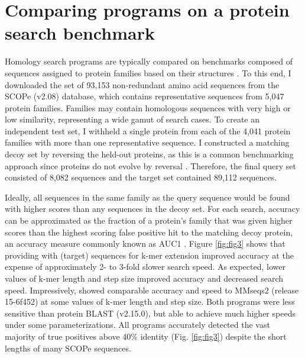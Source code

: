 \section{Comparing programs on a protein search benchmark}\label{comparing-programs-on-a-protein-search-benchmark}

Homology search programs are typically compared on benchmarks composed of sequences assigned to protein families based on their structures \citep{RN4253}. To this end, I downloaded the set of 93,153 non-redundant amino acid sequences from the SCOPe (v2.08) database, which contains representative sequences from 5,047 protein families. Families may contain homologous sequences with very high or low similarity, representing a wide gamut of search cases. To create an independent test set, I withheld a single protein from each of the 4,041 protein families with more than one representative sequence. I constructed a matching decoy set by reversing the held-out proteins, as this is a common benchmarking approach since proteins do not evolve by reversal \citep{RN4221}. Therefore, the final query set consisted of 8,082 sequences and the target set contained 89,112 sequences.

Ideally, all sequences in the same family as the query sequence would be found with higher scores than any sequences in the decoy set. For each search, accuracy can be approximated as the fraction of a protein's family that was given higher scores than the highest scoring false positive hit to the matching decoy protein, an accuracy measure commonly known as AUC1 \citep{RN4223}. Figure \ref{fig:fig3} shows that providing  with  (target) sequences for k-mer extension improved accuracy at the expense of approximately 2- to 3-fold slower search speed. As expected, lower values of k-mer length and step size improved accuracy and decreased search speed. Impressively,  showed comparable accuracy and speed to MMseqs2 (release 15-6f452) at some values of k-mer length and step size. Both programs were less sensitive than protein BLAST (v2.15.0), but able to achieve much higher speeds under some parameterizations. All programs accurately detected the vast majority of true positives above 40\% identity (Fig. \ref{fig:fig3}) despite the short lengths of many SCOPe sequences.

